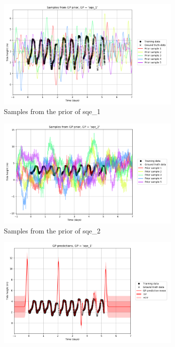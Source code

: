 \documentclass{article}
\begin{document}

\begin{figure}[pht]
    \centering
    \begin{subfigure}{0.45\textwidth}
        \centering
        \includegraphics[width=\textwidth]{Samples_from_GP_prior,_GP____sqe_1_.png}
        \caption{Samples from the prior of sqe\_1}
        \label{fig:prior_sqe_1}
    \end{subfigure}
    \begin{subfigure}{0.45\textwidth}
        \centering
        \includegraphics[width=\textwidth]{Samples_from_GP_prior,_GP____sqe_2_.png}
        \caption{Samples from the prior of sqe\_2}
        \label{fig:prior_sqe_2}
    \end{subfigure}
    \newline
    \begin{subfigure}{0.45\textwidth}
        \centering
        \includegraphics[width=\textwidth]{GP_predictions,_GP____sqe_1_.png}

\end{subfigure}
\end{figure}
\end{document}
